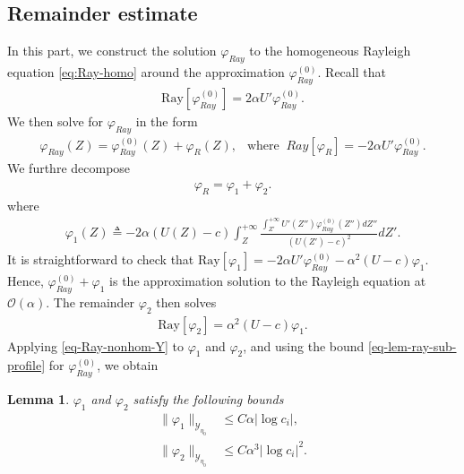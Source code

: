 \documentclass[reqno,11pt]{amsart}
\numberwithin{equation}{section}
\numberwithin{equation}{section}
\theoremstyle{plain}
\newtheorem{lemma}[theorem]{Lemma}
\begin{document}
				\subsection{Remainder estimate}
				
				
				In this part, we construct the solution $\varphi_{Ray}$ to the homogeneous Rayleigh equation \eqref{eq:Ray-homo} around the approximation $\varphi_{Ray}^{(0)}$. Recall that
				\begin{align*}
					\mathrm{Ray}[\varphi_{Ray}^{(0)}]=2\alpha U'\varphi_{Ray}^{(0)}.
				\end{align*}
		We then solve for $\varphi_{Ray}$ in the form 
				\begin{align*}
					\varphi_{Ray}(Z)=\varphi_{Ray}^{(0)}(Z)+\varphi_R(Z),\ \ \text{ where } \ Ray[\varphi_R]=-2\alpha U'\varphi_{Ray}^{(0)}.
				\end{align*}
			We furthre decompose
				\begin{align}\label{def-phi-R}
					\varphi_R=\varphi_1+\varphi_2.
				\end{align} 
			where
				\begin{align}\label{def-phi1}
					\varphi_1(Z)\triangleq-2\alpha(U(Z)-c)\int_Z^{+\infty} \frac{\int_{Z'}^{+\infty}U'(Z'')\varphi_{Ray}^{(0)}(Z'')dZ''}{(U(Z')-c)^{2}}dZ'.
				\end{align}
			It is straightforward to check that $\mathrm{Ray}[\varphi_1]=-2\alpha U'\varphi_{Ray}^{(0)}-\alpha^2(U-c)\varphi_1.$ Hence, $\varphi_{Ray}^{(0)}+\varphi_{1}$ is the approximation solution to the Rayleigh equation at $\mathcal{O}(\alpha)$. 
		The remainder $\varphi_2$ then solves
				\begin{align}
					\mathrm{Ray}[\varphi_2]=\alpha^2(U-c)\varphi_1.\nonumber
				\end{align}
	 Applying \eqref{eq-Ray-nonhom-Y} to $\varphi_1$ and $\varphi_2$, and using the bound \eqref{eq-lem-ray-sub-profile} for $\varphi^{(0)}_{Ray}$, we obtain
				
				\begin{lemma}\label{lem:ray-R}
				$\varphi_1$ and $\varphi_2$ satisfy the following bounds
				\begin{align}
					\|\varphi_1\|_{\mathcal{Y}_{\eta_0}}&\leq C\alpha|\log c_i|,\label{vphi1}\\
					\|\varphi_2\|_{\mathcal{Y}_{\eta_0}}&\leq C\alpha^3|\log c_i|^2.\label{vphi2}
				\end{align}
				\end{lemma}
			
\end{document}
